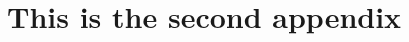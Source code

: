 \documentclass[12pt,notitlepage]{report}
\begin{document}
\newpage

\chapter{This is the second appendix}
\label{chapter:appendix_b}


\newpage





%

\begingroup
\raggedright


\endgroup

\end{document}

